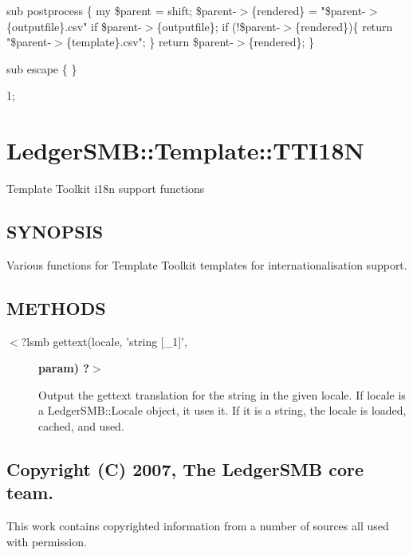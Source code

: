 \begin{description}
\begin{description}
\begin{description}
\begin{description}
\begin{description}
\begin{description}
\begin{description}
\begin{description}
\begin{description}
\begin{description}
sub postprocess \{
	my \$parent = shift;
	\$parent-$>$\{rendered\} = "\$parent-$>$\{outputfile\}.csv" if \$parent-$>$\{outputfile\};
        if (!\$parent-$>$\{rendered\})\{
            return "\$parent-$>$\{template\}.csv";
        \}
	return \$parent-$>$\{rendered\};
\}



sub escape \{
\}



1;

\section{LedgerSMB::Template::TTI18N\label{LedgerSMB::Template::TTI18N}}


Template Toolkit i18n support functions

\subsection*{SYNOPSIS\label{LedgerSMB::Template::TTI18N_SYNOPSIS}}


Various functions for Template Toolkit templates for internationalisation
support.

\subsection*{METHODS\label{LedgerSMB::Template::TTI18N_METHODS}}
\begin{description}

\item[{$<$?lsmb gettext(locale, 'string [\_1]',}] \textbf{param) ?$>$}

Output the gettext translation for the string in the given locale.  If
locale is a LedgerSMB::Locale object, it uses it.  If it is a string, the
locale is loaded, cached, and used.

\end{description}
\subsection*{Copyright (C) 2007, The LedgerSMB core team.\label{LedgerSMB::Template::TTI18N_Copyright_C_2007_The_LedgerSMB_core_team_}}


This work contains copyrighted information from a number of sources all used
with permission.




\end{description}
\end{description}
\end{description}
\end{description}
\end{description}
\end{description}
\end{description}
\end{description}
\end{description}
\end{description}
